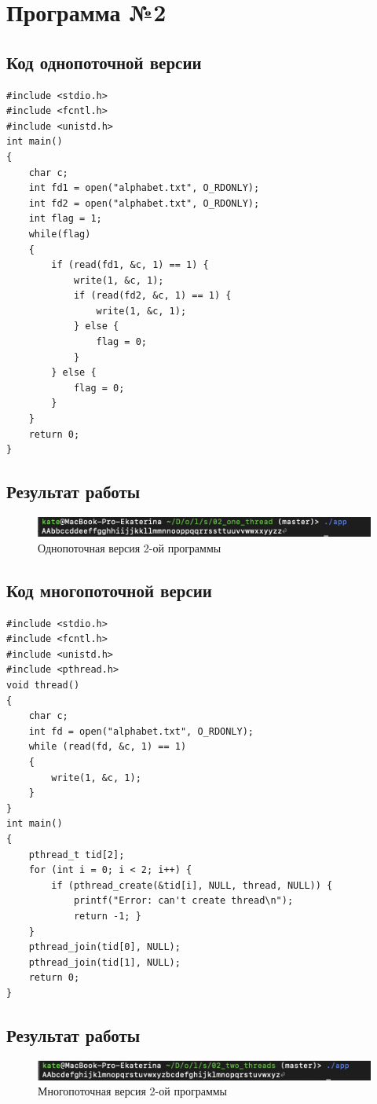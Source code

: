 \documentclass[12pt]{report}
\begin{document}
\section*{Программа №2}
\subsection*{Код однопоточной версии}
\begin{lstlisting}
#include <stdio.h>
#include <fcntl.h>
#include <unistd.h>
int main()
{
    char c;
    int fd1 = open("alphabet.txt", O_RDONLY);
    int fd2 = open("alphabet.txt", O_RDONLY);
    int flag = 1;
    while(flag)
    {
        if (read(fd1, &c, 1) == 1) {
            write(1, &c, 1);
            if (read(fd2, &c, 1) == 1) {
                write(1, &c, 1);
            } else {
                flag = 0;
            }
        } else {
            flag = 0;
        }
    }
    return 0;
}
\end{lstlisting}

\subsection*{Результат работы}
\begin{figure}[H]
	\centering
	\includegraphics[scale=1]{res_02_one.png}
	\caption{Однопоточная версия 2-ой программы}
	\label{fig:1}
\end{figure}
\newpage
\subsection*{Код многопоточной версии}
\begin{lstlisting}
#include <stdio.h>
#include <fcntl.h>
#include <unistd.h>
#include <pthread.h>
void thread()
{
    char c;
    int fd = open("alphabet.txt", O_RDONLY);
    while (read(fd, &c, 1) == 1)
    {
        write(1, &c, 1);
    }
}
int main()
{
    pthread_t tid[2];
    for (int i = 0; i < 2; i++) {
        if (pthread_create(&tid[i], NULL, thread, NULL)) {
            printf("Error: can't create thread\n");
            return -1; }
    }
    pthread_join(tid[0], NULL);
    pthread_join(tid[1], NULL);
    return 0;
}
\end{lstlisting}

\subsection*{Результат работы}
\begin{figure}[H]
	\centering
	\includegraphics[scale=1]{res_02_two.png}
	\caption{Многопоточная версия 2-ой программы}
	\label{fig:1}
\end{figure}
\end{document}
